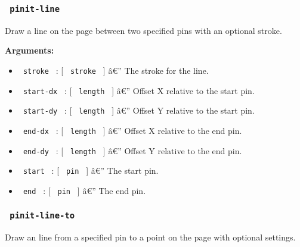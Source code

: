 \subsubsection{\texorpdfstring{\texttt{\ pinit-line\ }}{ pinit-line }}\label{pinit-line}

Draw a line on the page between two specified pins with an optional
stroke.

\begin{Shaded}
\begin{Highlighting}[]
\end{Highlighting}
\end{Shaded}

\textbf{Arguments:}

\begin{itemize}
\tightlist
\item
  \texttt{\ stroke\ } : {[} \texttt{\ stroke\ } {]} â€'' The stroke for
  the line.
\item
  \texttt{\ start-dx\ } : {[} \texttt{\ length\ } {]} â€'' Offset X
  relative to the start pin.
\item
  \texttt{\ start-dy\ } : {[} \texttt{\ length\ } {]} â€'' Offset Y
  relative to the start pin.
\item
  \texttt{\ end-dx\ } : {[} \texttt{\ length\ } {]} â€'' Offset X
  relative to the end pin.
\item
  \texttt{\ end-dy\ } : {[} \texttt{\ length\ } {]} â€'' Offset Y
  relative to the end pin.
\item
  \texttt{\ start\ } : {[} \texttt{\ pin\ } {]} â€'' The start pin.
\item
  \texttt{\ end\ } : {[} \texttt{\ pin\ } {]} â€'' The end pin.
\end{itemize}

\subsubsection{\texorpdfstring{\texttt{\ pinit-line-to\ }}{ pinit-line-to }}\label{pinit-line-to}

Draw an line from a specified pin to a point on the page with optional
settings.

\begin{Shaded}
\begin{Highlighting}[]
\end{Highlighting}
\end{Shaded}

